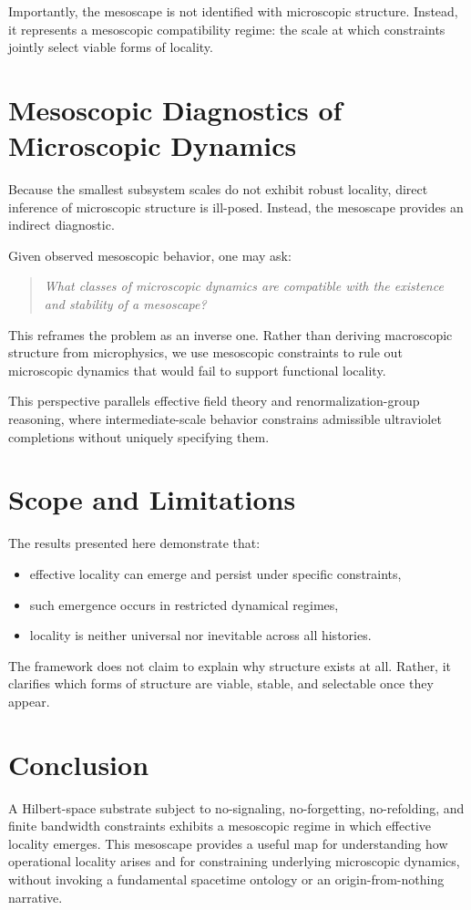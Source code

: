\documentclass[11pt]{article}
\begin{document}
Importantly, the mesoscape is not identified with microscopic structure. Instead, it represents a mesoscopic compatibility regime: the scale at which constraints jointly select viable forms of locality.

\section{Mesoscopic Diagnostics of Microscopic Dynamics}

Because the smallest subsystem scales do not exhibit robust locality, direct inference of microscopic structure is ill-posed. Instead, the mesoscape provides an indirect diagnostic.

Given observed mesoscopic behavior, one may ask:
\begin{quote}
\emph{What classes of microscopic dynamics are compatible with the existence and stability of a mesoscape?}
\end{quote}

This reframes the problem as an inverse one. Rather than deriving macroscopic structure from microphysics, we use mesoscopic constraints to rule out microscopic dynamics that would fail to support functional locality.

This perspective parallels effective field theory and renormalization-group reasoning, where intermediate-scale behavior constrains admissible ultraviolet completions without uniquely specifying them.

\section{Scope and Limitations}

The results presented here demonstrate that:
\begin{itemize}
    \item effective locality can emerge and persist under specific constraints,
    \item such emergence occurs in restricted dynamical regimes,
    \item locality is neither universal nor inevitable across all histories.
\end{itemize}

The framework does not claim to explain why structure exists at all. Rather, it clarifies which forms of structure are viable, stable, and selectable once they appear.

\section{Conclusion}

A Hilbert-space substrate subject to no-signaling, no-forgetting, no-refolding, and finite bandwidth constraints exhibits a mesoscopic regime in which effective locality emerges. This mesoscape provides a useful map for understanding how operational locality arises and for constraining underlying microscopic dynamics, without invoking a fundamental spacetime ontology or an origin-from-nothing narrative.
\end{document}
